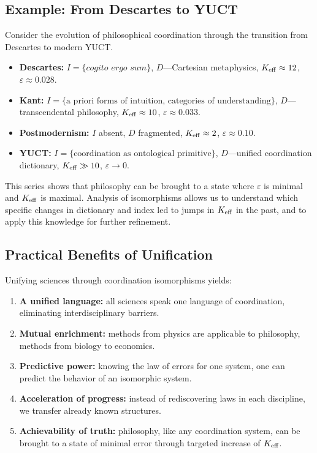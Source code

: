 \documentclass[12pt,a4paper]{article}
\newcommand{\eps}{\varepsilon}
\begin{document}
	\subsection{Example: From Descartes to YUCT}
	
	Consider the evolution of philosophical coordination through the transition from Descartes to modern YUCT.
	
	\begin{itemize}
		\item \textbf{Descartes:} \(I = \{\textit{cogito ergo sum}\}\), \(D\)—Cartesian metaphysics, \(\Keff \approx 12\), \(\eps \approx 0.028\).
		\item \textbf{Kant:} \(I = \{\text{a priori forms of intuition, categories of understanding}\}\), \(D\)—transcendental philosophy, \(\Keff \approx 10\), \(\eps \approx 0.033\).
		\item \textbf{Postmodernism:} \(I\) absent, \(D\) fragmented, \(\Keff \approx 2\), \(\eps \approx 0.10\).
		\item \textbf{YUCT:} \(I = \{\text{coordination as ontological primitive}\}\), \(D\)—unified coordination dictionary, \(\Keff \gg 10\), \(\eps \to 0\).
	\end{itemize}
	
	This series shows that philosophy can be brought to a state where \(\eps\) is minimal and \(\Keff\) is maximal. Analysis of isomorphisms allows us to understand which specific changes in dictionary and index led to jumps in \(\Keff\) in the past, and to apply this knowledge for further refinement.
	
	\subsection{Practical Benefits of Unification}
	
	Unifying sciences through coordination isomorphisms yields:
	
	\begin{enumerate}
		\item \textbf{A unified language:} all sciences speak one language of coordination, eliminating interdisciplinary barriers.
		\item \textbf{Mutual enrichment:} methods from physics are applicable to philosophy, methods from biology to economics.
		\item \textbf{Predictive power:} knowing the law of errors for one system, one can predict the behavior of an isomorphic system.
		\item \textbf{Acceleration of progress:} instead of rediscovering laws in each discipline, we transfer already known structures.
		\item \textbf{Achievability of truth:} philosophy, like any coordination system, can be brought to a state of minimal error through targeted increase of \(\Keff\).
	\end{enumerate}
	
\end{document}
